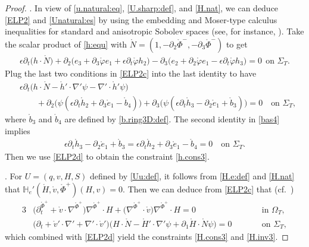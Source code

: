 \documentclass[twoside,11pt]{article}
\numberwithin{equation}{section}
\def\p{\partial}
\begin{document}
\begin{proof}
		\vspace*{2mm}
.\quad
In view of \eqref{u.natural:eq}, \eqref{U.sharp:def}, and \eqref{H.nat}, we can deduce \eqref{ELP2} and  \eqref{Unatural:es} by using the embedding and Moser-type calculus inequalities for standard and anisotropic Sobolev spaces (see, for instance, \cite[\S 3.2]{TW21MR4201624}).
Take the scalar product of \eqref{h:equ} with $\mathring{N}=(1,-\p_2\mathring{\Phi}^-,-\p_3\mathring{\Phi}^-)$ to get
\begin{align}
	\nonumber %
	\epsilon \p_t\big(h\cdot \mathring{N}\big)
	+\p_2\big(e_3 +\p_3\mathring{\varphi}e_1+\epsilon \p_t\mathring{\varphi} h_2\big)
	-\p_3\big(e_2+\p_2\mathring{\varphi}e_1-\epsilon \p_t\mathring{\varphi} h_3\big)
	=0
	\ \  \textrm{on } \Sigma_{T}.
\end{align}
Plug the last two conditions in \eqref{ELP2c} into the last identity to have
\begin{align*}
	&	\epsilon\p_t\big(h\cdot \mathring{N}-\mathring{h}'\cdot\nabla'\psi -\nabla'\cdot\mathring{h}'\psi\big)\\
	&\qquad	+\p_2\big(\psi(\epsilon\p_t \mathring{h}_2+\p_3\mathring{e}_1 -\mathring{b}_4)\big)
	+\p_3\big(\psi(\epsilon\p_t \mathring{h}_3-\p_2\mathring{e}_1 +\mathring{b}_3)\big)	
	=0
	\quad \textrm{on }\Sigma_{T},
\end{align*}
where $\mathring{b}_3$ and $\mathring{b}_4$ are defined by \eqref{b.ring3D:def}.
The second identity in \eqref{bas4} implies
\begin{align*}
	\epsilon\p_t \mathring{h}_3-\p_2\mathring{e}_1 +\mathring{b}_3=
	\epsilon\p_t \mathring{h}_2+\p_3\mathring{e}_1 -\mathring{b}_4=0
	\quad \textrm{on }\Sigma_{T}.
\end{align*}
Then we use \eqref{ELP2d} to obtain the constraint \eqref{h.cons3}.		
		
		\vspace*{2mm}
		.\quad
	For $U=(q, v,H,S)$ defined by \eqref{Uu:def},
it  follows from \eqref{H.e:def} and \eqref{H.nat} that  $\mathbb{H}_e'(\mathring{H},\mathring{v},\mathring{\Phi}^+)(H ,v )=0$.
Then we can deduce from \eqref{ELP2c}
that (cf.~\cite[Proposition 2]{T09ARMAMR2481071})
\begin{alignat}{3}
	\nonumber %
	&\big(\p_t^{\mathring{\Phi}^+}+\mathring{v}\cdot \nabla^{\mathring{\Phi}^+}\big) \nabla^{\mathring{\Phi}^+}\cdot {H}+\big(\nabla^{\mathring{\Phi}^+}\cdot \mathring{v}\big) \nabla^{\mathring{\Phi}^+}\cdot {H}=0 \quad
	&&\textrm{in } \Omega_T,\\
	& \big(\p_t+\mathring{v}'\cdot\nabla'+\nabla'\cdot\mathring{v}'\big)\big(H\cdot\mathring{N}-\mathring{H}'\cdot\nabla'\psi+\p_1\mathring{H}\cdot\mathring{N}\psi \big)=0
	&\qquad &\textrm{on } \Sigma_T,
	\nonumber%
\end{alignat}
which combined with \eqref{ELP2d} yield the constraints \eqref{H.cons3} and \eqref{H.inv3}.
		

\end{proof}
\end{document}
